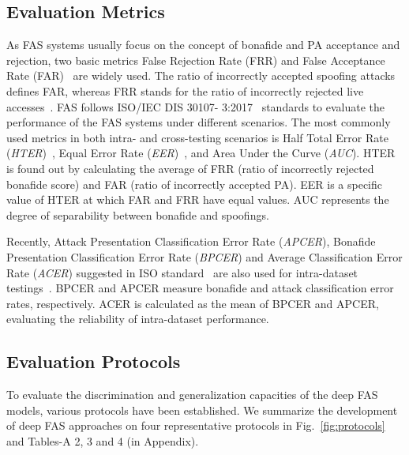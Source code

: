 \documentclass[10pt,journal,compsoc]{IEEEtran}
\begin{document}
\vspace{-0.8em}

\subsection{Evaluation Metrics}

As FAS systems usually focus on the concept of bonafide and PA acceptance and rejection, two basic metrics False Rejection Rate (FRR) and False Acceptance Rate (FAR)~\cite{galbally2012high} are widely used. The ratio of incorrectly accepted spoofing attacks defines FAR, whereas FRR stands for the ratio of incorrectly rejected live accesses~\cite{chingovska2014biometrics}. FAS follows ISO/IEC DIS 30107- 3:2017~\cite{iso2017information} standards to evaluate the performance of the FAS systems under different scenarios. The most commonly used metrics in both intra- and cross-testing scenarios is Half Total Error Rate (\textit{HTER})~\cite{chingovska2014biometrics}, Equal Error Rate (\textit{EER})~\cite{ramachandra2017presentation}, and Area Under the Curve (\textit{AUC}). HTER is found out by calculating the average of FRR (ratio of incorrectly rejected bonafide score) and FAR (ratio of incorrectly accepted PA). EER is a specific value of HTER at which FAR and FRR have equal values. AUC represents the degree of separability between bonafide and spoofings. 

Recently, Attack Presentation Classification Error Rate (\textit{APCER}), Bonafide Presentation Classification Error Rate (\textit{BPCER}) and Average Classification Error Rate (\textit{ACER}) suggested in ISO standard~\cite{iso2017information} are also used for intra-dataset testings~\cite{Boulkenafet2017OULU,Liu2018Learning}. BPCER and APCER measure bonafide and attack classification error rates, respectively. ACER is calculated as the mean of BPCER and APCER, evaluating the reliability of intra-dataset performance. 





\subsection{Evaluation Protocols}
\label{sec:protocols}



To evaluate the discrimination and generalization capacities of the deep FAS models, various protocols have been established. We summarize the development of deep FAS approaches on four representative protocols in Fig.~\ref{fig:protocols} and Tables-A 2, 3 and 4 (in Appendix).
\end{document}
